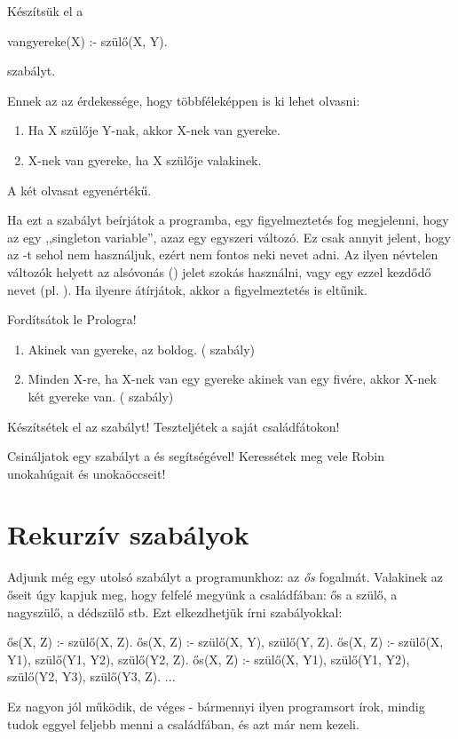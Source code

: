 Készítsük el a
\begin{prolog}
vangyereke(X) :- szülő(X, Y).
\end{prolog}
szabályt.

Ennek az az érdekessége, hogy többféleképpen is ki lehet olvasni:

\begin{enumerate}
\item Ha X szülője Y-nak, akkor X-nek van gyereke.
\item X-nek van gyereke, ha X szülője valakinek.
\end{enumerate}
A két olvasat egyenértékű.

Ha ezt a szabályt beírjátok a programba, egy figyelmeztetés fog megjelenni, hogy az  egy ,,singleton variable'', azaz egy egyszeri változó. Ez csak annyit jelent, hogy az -t sehol nem használjuk, ezért nem fontos neki nevet adni. Az ilyen névtelen változók helyett az alsóvonás (\pr{\_}) jelet szokás használni, vagy egy ezzel kezdődő nevet (pl. ). Ha ilyenre átírjátok, akkor a figyelmeztetés is eltűnik.

\begin{problem}
Fordítsátok le Prologra!
\begin{enumerate}  
\item Akinek van gyereke, az boldog. ( szabály)
\item Minden X-re, ha X-nek van egy gyereke akinek van egy fivére, akkor X-nek két gyereke van. ( szabály)
\end{enumerate}
\end{problem}
\begin{problem}
  Készítsétek el az  szabályt! Teszteljétek a saját családfátokon!
\end{problem}
\begin{problem}
  Csináljatok egy  szabályt a  és  segítségével! Keressétek meg vele Robin unokahúgait és unokaöccseit!
\end{problem}

\section{Rekurzív szabályok}

Adjunk még egy utolsó szabályt a programunkhoz: az \emph{ős} fogalmát. Valakinek az őseit úgy kapjuk meg, hogy felfelé megyünk a családfában: ős a szülő, a nagyszülő, a dédszülő stb. Ezt elkezdhetjük írni szabályokkal:
\begin{prolog}
ős(X, Z) :- szülő(X, Z).
ős(X, Z) :- szülő(X, Y), szülő(Y, Z).
ős(X, Z) :- szülő(X, Y1), szülő(Y1, Y2), szülő(Y2, Z).
ős(X, Z) :- szülő(X, Y1), szülő(Y1, Y2), szülő(Y2, Y3), szülő(Y3, Z).
...
\end{prolog}
Ez nagyon jól működik, de véges - bármennyi ilyen programsort írok, mindig tudok eggyel feljebb menni a családfában, és azt már nem kezeli.

